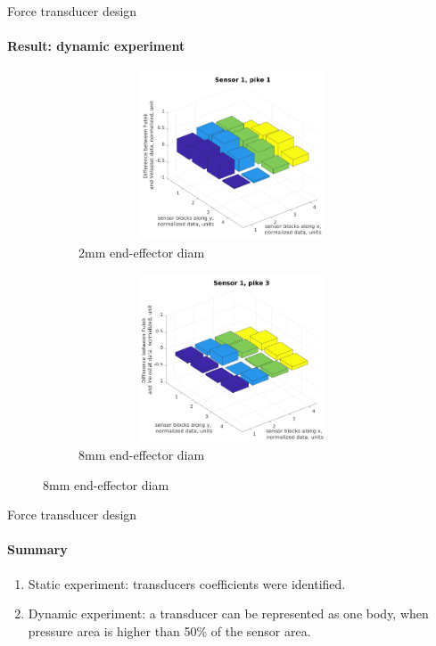 \documentclass[aspectratio=169]{beamer}
\begin{document}
\begin{frame}[t]{Force transducer design}
    \framesubtitle{Result: dynamic experiment}
    \vspace{-15pt}
    \begin{figure}[H]
        \begin{subfigure}{0.49\textwidth}
            \centering\includegraphics[height=5cm,width=1\textwidth,keepaspectratio]{sens1_pike1.png}
            \caption*{2mm end-effector diam}
            \label{fig:sens1_pike1}
        \end{subfigure}
        \begin{subfigure}{0.49\textwidth}
            \centering\includegraphics[height=5cm,width=1\textwidth,keepaspectratio]{sens1_pike3.png}
            \caption*{8mm end-effector diam}
            \label{fig:sens1_pike3}
        \end{subfigure}
    \end{figure}
\end{frame}

\begin{frame}[t]{Force transducer design}
    \framesubtitle{Summary}
    \vspace{-15pt}
    {\Large
        \begin{enumerate}
            \item Static experiment: transducers coefficients were identified.
            \item Dynamic experiment: a transducer can be represented as one body, when pressure area is higher than 50\% of the sensor area.
        \end{enumerate}
    }
\end{frame}
\end{document}
